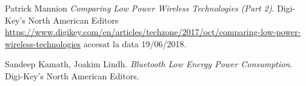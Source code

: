 \documentclass[12pt,a4paper]{report}
\begin{document}
\begin{thebibliography}{9}
Patrick Mannion
\textit{Comparing Low Power Wireless Technologies (Part 2)}.
Digi-Key's North American Editors
\href{https://www.digikey.com/en/articles/techzone/2017/oct/comparing-low-power-wireless-technologies}{https://www.digikey.com/en/articles/techzone/2017/oct/comparing-low-power-wireless-technologies} accesat la data 19/06/2018.

Sandeep Kamath, Joakim Lindh.
\textit{Bluetooth Low Energy Power Consumption}.
Digi-Key's North American Editors.

\end{thebibliography}
\end{document}
